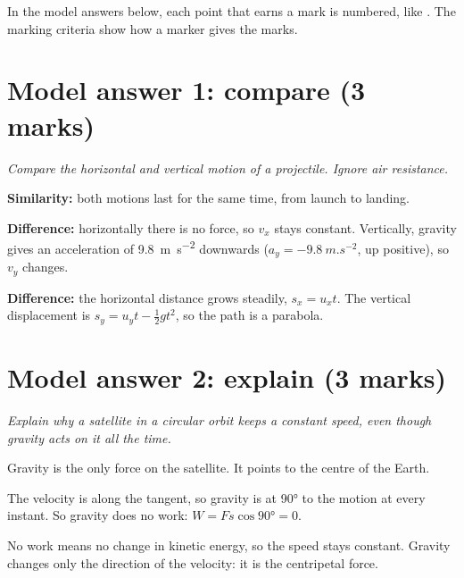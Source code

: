 In the model answers below, each point that earns a mark is numbered, like . The
marking criteria show how a marker gives the marks.

\section*{Model answer 1: compare (3 marks)}

\emph{Compare the horizontal and vertical motion of a projectile. Ignore air resistance.}

\begin{modelanswer}
 \textbf{Similarity:} both motions last for the same time, from launch to landing.

 \textbf{Difference:} horizontally there is no force, so $v_x$ stays constant.
Vertically, gravity gives an acceleration of \qty{9.8}{m.s^{-2}} downwards
($a_y = \qty{-9.8}{m.s^{-2}}$, up positive), so $v_y$ changes.

 \textbf{Difference:} the horizontal distance grows steadily, $s_x = u_x t$. The
vertical displacement is $s_y = u_y t - \frac{1}{2}gt^2$, so the path is a parabola.
\end{modelanswer}

\begin{markingcriteria}
\end{markingcriteria}

\section*{Model answer 2: explain (3 marks)}

\emph{Explain why a satellite in a circular orbit keeps a constant speed, even though gravity
acts on it all the time.}

\begin{modelanswer}
 Gravity is the only force on the satellite. It points to the centre of the Earth.

 The velocity is along the tangent, so gravity is at \ang{90} to the motion at
every instant. So gravity does no work: $W = Fs\cos\ang{90} = 0$.

 No work means no change in kinetic energy, so the speed stays constant. Gravity
changes only the direction of the velocity: it is the centripetal force.
\end{modelanswer}

